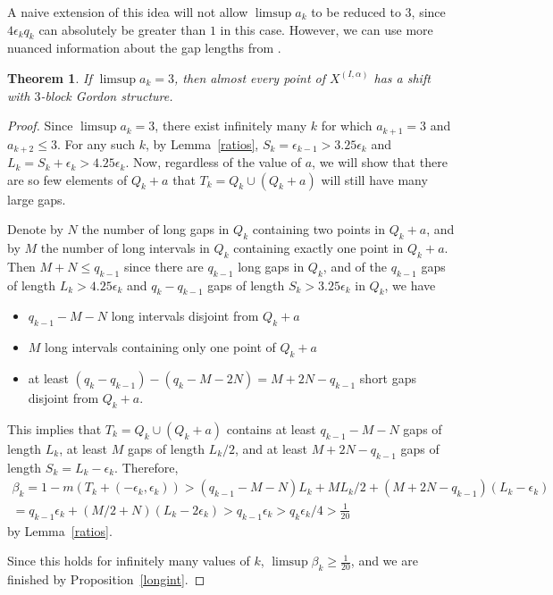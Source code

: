 \documentclass[11pt,reqno]{amsart}
\newtheorem{theorem}{Theorem}[section]
\theoremstyle{definition}
\theoremstyle{plain}
\begin{document}
A naive extension of this idea will not allow $\limsup a_k$ to be reduced to $3$, since $4 \epsilon_k q_k$ can absolutely be greater than $1$ in this case. However, we can use more nuanced information about the gap lengths from . 

\begin{theorem}\label{case1}
If $\limsup a_k = 3$, then almost every point of $X^{(I, \alpha)}$ has a shift with $3$-block Gordon structure.
\end{theorem}

\begin{proof}
Since $\limsup a_k = 3$, there exist infinitely many $k$ for which $a_{k+1} = 3$ and $a_{k+2} \leq 3$. For any such $k$, by 
Lemma~\ref{ratios}, $S_k = \epsilon_{k-1} > 3.25 \epsilon_k$ and $L_k = S_k + \epsilon_k > 4.25 \epsilon_k$. Now, regardless of the value of $a$, we will show that there are so few elements of $Q_k + a$ that $T_k = Q_k \cup (Q_k + a)$ will still have many large gaps.

Denote by $N$ the number of long gaps in $Q_k$ containing two points in $Q_k + a$, and by 
$M$ the number of long intervals in $Q_k$ containing exactly one point in $Q_k + a$. 
Then $M + N \leq q_{k-1}$ since there are $q_{k-1}$ long gaps in $Q_k$, and of the $q_{k-1}$ 
gaps of length $L_k > 4.25 \epsilon_k$ and $q_k - q_{k-1}$ gaps of length $S_k > 3.25 \epsilon_k$ in $Q_k$, we have

\begin{itemize}
\item $q_{k-1} - M - N$ long intervals disjoint from $Q_k + a$
\item $M$ long intervals containing only one point of $Q_k + a$
\item at least $(q_k - q_{k-1}) - (q_k - M - 2N) = M + 2N - q_{k-1}$ short gaps disjoint from $Q_k + a$.
\end{itemize}

This implies that $T_k = Q_k \cup (Q_k + a)$ contains at least $q_{k-1} - M - N$ gaps of length $L_k$, 
at least $M$ gaps of length $L_k/2$, and at least $M + 2N - q_{k-1}$ gaps of length $S_k = L_k - \epsilon_k$. Therefore,
\begin{multline*}
\beta_k = 1 - m(T_k + (-\epsilon_k, \epsilon_k)) > (q_{k-1} - M - N) L_k + ML_k/2 + 
(M + 2N - q_{k-1})(L_k - \epsilon_k) \\
= q_{k-1} \epsilon_k + (M/2 + N)(L_k - 2\epsilon_k) > q_{k-1} \epsilon_k > q_k \epsilon_k / 4 > \frac{1}{20}
\end{multline*}
by Lemma~\ref{ratios}.

Since this holds for infinitely many values of $k$, $\limsup \beta_k \geq \frac{1}{20}$, and we are finished
by Proposition~\ref{longint}.

\end{proof}
\end{document}
